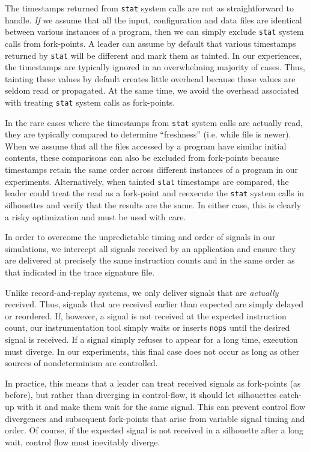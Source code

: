 The timestamps returned from
\texttt{stat} system calls
are not as straightforward
to handle. {\em If} we assume
that all the input, configuration
and data files are identical
between various instances of
a program, then we can 
simply exclude \texttt{stat}
system calls from fork-points.
A leader can assume
by default that various timestamps
returned by \texttt{stat} will
be different and mark
them as tainted.
In our experiences,
the timestamps are typically
ignored in an overwhelming 
majority of cases. Thus, 
tainting these values by
default creates little overhead
because these values are seldom
read or propagated. At the same time,
we avoid the overhead associated
with treating \texttt{stat}
system calls as fork-points.

In the rare cases where
the timestamps from \texttt{stat}
system calls are actually read,
they are typically compared to
determine ``freshness''
(i.e. while file is newer).
When we assume that all
the files accessed by a program
have similar initial contents,
these comparisons can also
be excluded from 
fork-points because timestamps
retain the same order across different
instances of a program
in our experiments. 
Alternatively, when tainted
\texttt{stat} timestamps are compared,
the leader could treat the read as a fork-point
and reexecute the \texttt{stat} system
calls in silhouettes and verify that
the results are the same. In either case, this is clearly a risky
optimization and must be used with care. \newline

 \newline
In order to overcome the unpredictable timing and 
order of signals in our simulations, we intercept all signals received by 
an application and ensure they are delivered
at precisely the same instruction counts
and in the same order as that indicated
in the trace signature file.

Unlike record-and-replay systems, we only
deliver signals that are {\em actually}
received. Thus, signals that are received earlier
than expected are simply delayed or reordered. If,
however, a signal is not received at the expected
instruction count, our instrumentation tool
simply waits or inserts \texttt{nops} until the 
desired signal is received. If a signal simply
refuses to appear for a long time, execution
must diverge. In our experiments,
this final case does not occur as long
as other sources of nondeterminism are controlled. 

In practice, this means that a leader can treat 
received signals as fork-points (as before),
but rather than diverging in control-flow,
it should let silhouettes catch-up with it
and make them wait for the same signal.
This can prevent control
flow divergences and subsequent fork-points that arise from 
variable signal timing and order.
Of course, if the expected
signal is not received in a silhouette
after a long wait, control flow must inevitably diverge.
\newline

